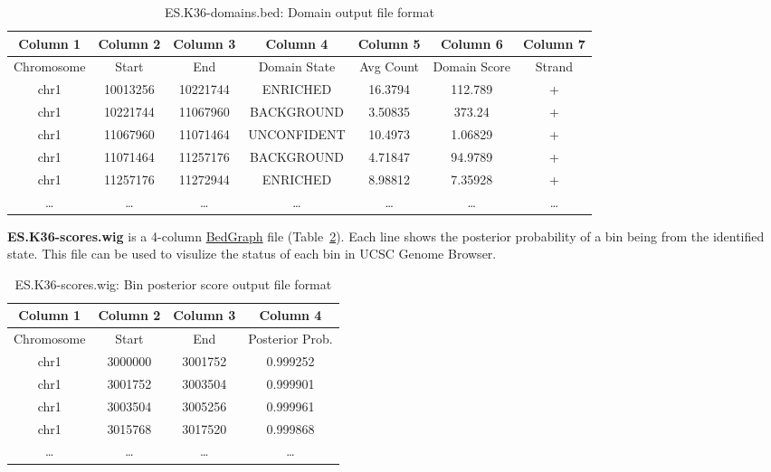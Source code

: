 \documentclass[11pt]{report}
\begin{document}
\begin{table}[th]
  \centering
  \begin{tabular}{c c c c c c c}
Column 1 & Column 2 & Column 3 &  Column 4 & Column 5 &  Column 6  &
Column 7 \\
\hline
Chromosome  & Start & End & Domain State &  Avg Count & Domain Score &  Strand \\
\hline
chr1&    10013256&        10221744&        ENRICHED&        16.3794& 112.789 &+\\
chr1&    10221744&       11067960 &      BACKGROUND&      3.50835& 373.24 & +\\
chr1&    11067960&        11071464&        UNCONFIDENT&     10.4973 &1.06829 &+\\
chr1&    11071464&        11257176&        BACKGROUND&      4.71847& 94.9789 &+\\
chr1&    11257176&        11272944&        ENRICHED &       8.98812& 7.35928 &+\\
\ldots & \ldots &\ldots &\ldots &\ldots &\ldots & \ldots\\ 
\hline
  \end{tabular}
  \caption{ES.K36-domains.bed: Domain output file format}
  \label{tab:format-domain}
\end{table}

\textbf{ES.K36-scores.wig} is a 4-column
\href{http://genome.ucsc.edu/goldenPath/help/bedgraph.html}{BedGraph}
file (Table~\ref{tab:format-bin-score}). Each line shows the posterior
probability of a bin being from the identified state. This file can be
used to visulize the status of each bin in UCSC Genome Browser.

\begin{table}[th]
  \centering
  \begin{tabular}{c c c c}
Column 1 & Column 2 & Column 3 &  Column 4  \\
\hline
Chromosome  & Start & End & Posterior Prob. \\
\hline
chr1&    3000000& 3001752& 0.999252\\
chr1&    3001752& 3003504& 0.999901\\
chr1&    3003504& 3005256& 0.999961\\
chr1&    3015768& 3017520& 0.999868\\
\ldots & \ldots &\ldots &\ldots \\ 
\hline
  \end{tabular}
  \caption{ES.K36-scores.wig: Bin posterior score  output file format}
  \label{tab:format-bin-score}
\end{table}
\end{document}
